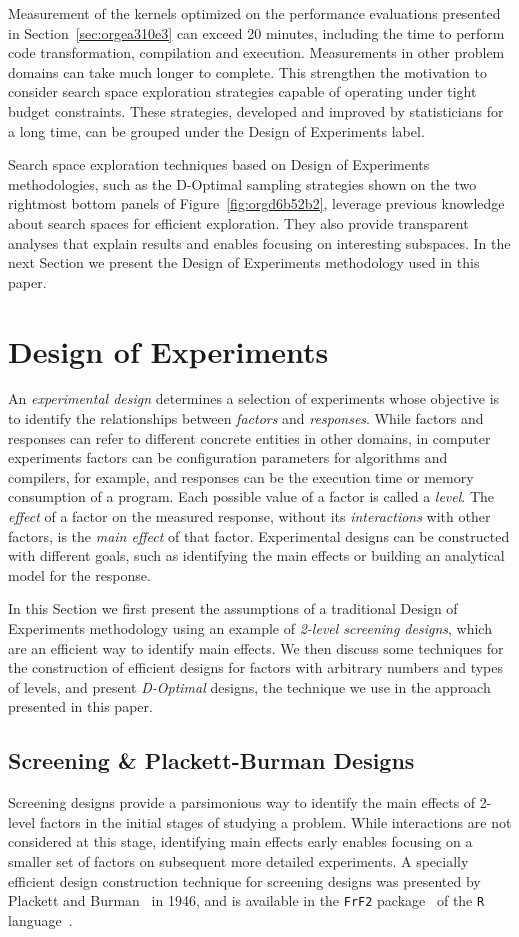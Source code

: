 \documentclass[conference]{IEEEtran}
\begin{document}
Measurement of the kernels optimized on the performance evaluations presented in
Section~\ref{sec:orgea310e3} can exceed 20 minutes, including the time
to perform code transformation, compilation and execution. Measurements in other
problem domains can take much longer to complete. This strengthen the motivation
to consider search space exploration strategies capable of operating under tight
budget constraints. These strategies, developed and improved by statisticians
for a long time, can be grouped under the Design of Experiments label.

Search space exploration techniques based on Design of Experiments
methodologies, such as the D-Optimal sampling strategies shown on the two
rightmost bottom panels of Figure~\ref{fig:orgd6b52b2}, leverage
previous knowledge about search spaces for efficient exploration. They also
provide transparent analyses that explain results and enables focusing on
interesting subspaces. In the next Section we present the Design of Experiments
methodology used in this paper.
\section{Design of Experiments}
\label{sec:org33c8024}
An \emph{experimental design} determines a selection of experiments whose objective
is to identify the relationships between \emph{factors} and \emph{responses}. While
factors and responses can refer to different concrete entities in other domains,
in computer experiments factors can be configuration parameters for algorithms
and compilers, for example, and responses can be the execution time or memory
consumption of a program. Each possible value of a factor is called a \emph{level}.
The \emph{effect} of a factor on the measured response, without its \emph{interactions}
with other factors, is the \emph{main effect} of that factor. Experimental designs
can be constructed with different goals, such as identifying the main effects
or building an analytical model for the response.

In this Section we first present the assumptions of a traditional Design of
Experiments methodology using an example of \emph{2-level screening designs}, which
are an efficient way to identify main effects. We then discuss some techniques
for the construction of efficient designs for factors with arbitrary numbers and
types of levels, and present \emph{D-Optimal} designs, the technique we use in the
approach presented in this paper.
\subsection{Screening \& Plackett-Burman Designs}
\label{sec:org807f680}
Screening designs provide a parsimonious way to identify the main
effects of 2-level factors in the initial stages of studying a problem. While
interactions are not considered at this stage, identifying main effects early
enables focusing on a smaller set of factors on subsequent more detailed
experiments. A specially efficient design construction technique for screening
designs was presented by Plackett and Burman~\cite{plackett1946design} in
1946, and is available in the \texttt{FrF2}
package~\cite{gromping2014frf2} of the \texttt{R}
language~\cite{team2018rlanguage}.
\end{document}
